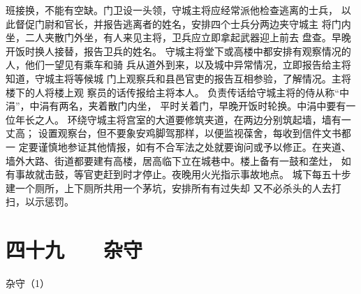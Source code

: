 \documentclass[12pt,UTF8]{ctexbook}
\begin{document}
班接换，不能有空缺。门卫设一头领，守城主将应经常派他检查逃离的士兵， 
以此督促门尉和官长，并报告逃离者的姓名，安排四个士兵分两边夹守城主 
将门内坐，二人夹散门外坐，有人来见主将，卫兵应立即拿起武器迎上前去 
盘查。早晚开饭时换人接替，报告卫兵的姓名。 
守城主将堂下或高楼中都安排有观察情况的人，他们一望见有乘车和骑 
兵从道外到来，以及城中异常情况，立即报告给主将知道，守城主将等候城 
门上观察兵和县邑官吏的报告互相参验，了解情况。主将楼下的人将楼上观 
察员的话传报给主将本人。 
负责传话给守城主将的侍从称“中涓”，中涓有两名，夹着散门内坐， 
平时关着门，早晚开饭时轮换。中涓中要有一位年长之人。 
环绕守城主将宫室的大道要修筑夹道，在两边分别筑起墙，墙有一丈高； 
设置观察台，但不要象安鸡脚驾那样，以便监视葆舍，每收到信件文书都一 
定要谨慎地参证其他情报，如有不合军法之处就要询问或予以修正。在夹道、 
墙外大路、街道都要建有高楼，居高临下立在城巷中。楼上备有一鼓和垄灶， 
如有事故就击鼓，等官吏赶到时才停止。夜晚用火光指示事故地点。 
城下每五十步建一个厕所，上下厕所共用一个茅坑，安排所有有过失却 
又不必杀头的人去打扫，以示惩罚。 

\chapter{四十九　　杂守}

杂守（1）
\end{document}
